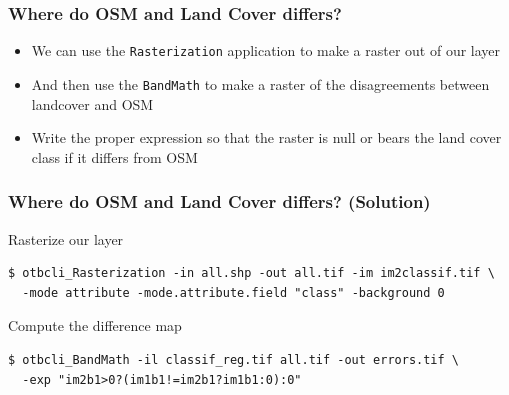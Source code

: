 \documentclass[8pt]{beamer}
\begin{document}
\begin{frame}
\frametitle{Where do OSM and Land Cover differs?}

\begin{itemize}
\item We can use the \texttt{Rasterization} application to make a raster out of our layer
\item And then use the \texttt{BandMath} to make a raster of the disagreements between landcover and OSM
\item Write the proper expression so that the raster is null or bears the land cover class if it differs from OSM
\end{itemize}

\end{frame}

\begin{frame}[fragile]
\frametitle{Where do OSM and Land Cover differs? (Solution)}

\begin{block}{Rasterize our layer}
\begin{scriptsize}
\begin{verbatim}
$ otbcli_Rasterization -in all.shp -out all.tif -im im2classif.tif \
  -mode attribute -mode.attribute.field "class" -background 0
\end{verbatim}
\end{scriptsize}
\end{block}
\begin{block}{Compute the difference map}
\begin{scriptsize}
\begin{verbatim}
$ otbcli_BandMath -il classif_reg.tif all.tif -out errors.tif \
  -exp "im2b1>0?(im1b1!=im2b1?im1b1:0):0"
\end{verbatim}
\end{scriptsize}
\end{block}
\end{frame}
\end{document}
